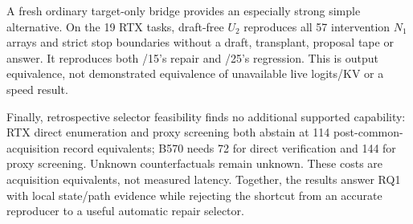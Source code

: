 A fresh ordinary target-only bridge provides an especially strong simple alternative. On the 19 RTX tasks, draft-free $U_2$ reproduces all 57 intervention $N_1$ arrays and strict stop boundaries without a draft, transplant, proposal tape or answer. It reproduces both /15's repair and /25's regression. This is output equivalence, not demonstrated equivalence of unavailable live logits/KV or a speed result.

Finally, retrospective selector feasibility finds no additional supported capability: RTX direct enumeration and proxy screening both abstain at 114 post-common-acquisition record equivalents; B570 needs 72 for direct verification and 144 for proxy screening. Unknown counterfactuals remain unknown. These costs are acquisition equivalents, not measured latency. Together, the results answer RQ1 with local state/path evidence while rejecting the shortcut from an accurate reproducer to a useful automatic repair selector.

